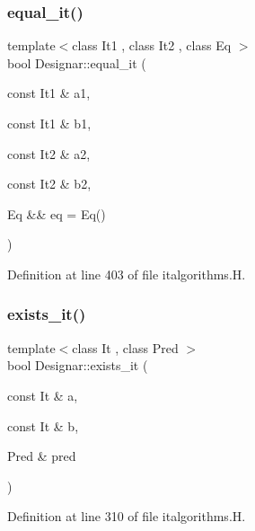 \subsubsection{\texorpdfstring{equal\+\_\+it()}{equal\_it()}\hspace{0.1cm}{\footnotesize\ttfamily [2/2]}}
{\footnotesize\ttfamily template$<$class It1 , class It2 , class Eq $>$ \\
bool Designar\+::equal\+\_\+it (\begin{DoxyParamCaption}\item[{const It1 \&}]{a1,  }\item[{const It1 \&}]{b1,  }\item[{const It2 \&}]{a2,  }\item[{const It2 \&}]{b2,  }\item[{Eq \&\&}]{eq = {\ttfamily Eq()} }\end{DoxyParamCaption})}



Definition at line 403 of file italgorithms.\+H.

\mbox{\label{namespace_designar_a65348ae854999f031477dcc97f6a4865}} 
\subsubsection{\texorpdfstring{exists\+\_\+it()}{exists\_it()}\hspace{0.1cm}{\footnotesize\ttfamily [1/2]}}
{\footnotesize\ttfamily template$<$class It , class Pred $>$ \\
bool Designar\+::exists\+\_\+it (\begin{DoxyParamCaption}\item[{const It \&}]{a,  }\item[{const It \&}]{b,  }\item[{Pred \&}]{pred }\end{DoxyParamCaption})}



Definition at line 310 of file italgorithms.\+H.

\mbox{\label{namespace_designar_abac7b042ab21f3b7e1359cbec17b5e96}} 
